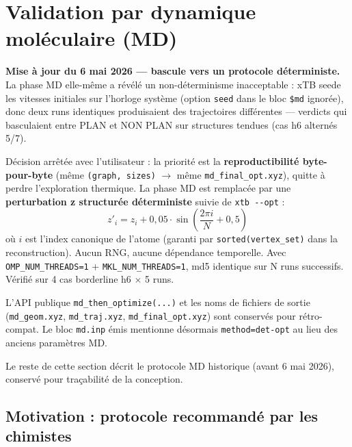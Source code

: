 \section{Validation par dynamique moléculaire (MD)}


\begin{attention}
\textbf{Mise à jour du 6 mai 2026 — bascule vers un protocole déterministe.}
La phase MD elle-même a révélé un non-déterminisme inacceptable : xTB seede
les vitesses initiales sur l'horloge système (option \texttt{seed} dans le
bloc \texttt{\$md} ignorée), donc deux runs identiques produisaient des
trajectoires différentes — verdicts qui basculaient entre PLAN et NON PLAN
sur structures tendues (cas h6 alternés 5/7).

Décision arrêtée avec l'utilisateur : la priorité est la \textbf{reproductibilité
byte-pour-byte} (même \texttt{(graph, sizes)} $\to$ même \texttt{md\_final\_opt.xyz}),
quitte à perdre l'exploration thermique. La phase MD est remplacée par une
\textbf{perturbation z structurée déterministe} suivie de \texttt{xtb -{}-opt} :
\[
  z'_i = z_i + 0{,}05 \cdot \sin\!\left(\frac{2\pi i}{N} + 0{,}5\right)
\]
où $i$ est l'index canonique de l'atome (garanti par \texttt{sorted(vertex\_set)}
dans la reconstruction). Aucun RNG, aucune dépendance temporelle. Avec
\texttt{OMP\_NUM\_THREADS=1} + \texttt{MKL\_NUM\_THREADS=1}, md5 identique
sur N runs successifs. Vérifié sur 4 cas borderline h6 $\times$ 5 runs.

L'API publique \texttt{md\_then\_optimize(...)} et les noms de fichiers
de sortie (\texttt{md\_geom.xyz}, \texttt{md\_traj.xyz}, \texttt{md\_final\_opt.xyz})
sont conservés pour rétro-compat. Le bloc \texttt{md.inp} émis mentionne
désormais \texttt{method=det-opt} au lieu des anciens paramètres MD.

Le reste de cette section décrit le protocole MD historique
(avant 6 mai 2026), conservé pour traçabilité de la conception.
\end{attention}

\subsection{Motivation : protocole recommandé par les chimistes}

